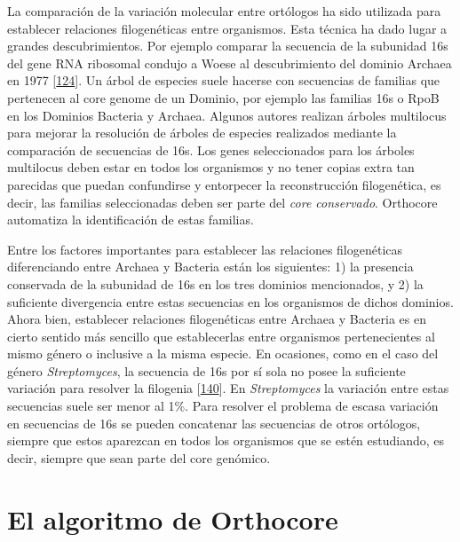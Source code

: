 \documentclass[12pt,twoside]{reedthesis}
\begin{document}
  La comparación de la variación molecular entre ortólogos ha sido
  utilizada para establecer relaciones filogenéticas entre organismos.
  Esta técnica ha dado lugar a grandes descubrimientos. Por ejemplo
  comparar la secuencia de la subunidad 16s del gene RNA ribosomal condujo
  a Woese al descubrimiento del dominio Archaea en 1977
  {[}\protect\hyperlink{ref-woese_phylogenetic_1977}{124}{]}. Un árbol de
  especies suele hacerse con secuencias de familias que pertenecen al core
  genome de un Dominio, por ejemplo las familias 16s o RpoB en los
  Dominios Bacteria y Archaea. Algunos autores realizan árboles multilocus
  para mejorar la resolución de árboles de especies realizados mediante la
  comparación de secuencias de 16s. Los genes seleccionados para los
  árboles multilocus deben estar en todos los organismos y no tener copias
  extra tan parecidas que puedan confundirse y entorpecer la
  reconstrucción filogenética, es decir, las familias seleccionadas deben
  ser parte del \emph{core conservado}. Orthocore automatiza la
  identificación de estas familias.
  
  Entre los factores importantes para establecer las relaciones
  filogenéticas diferenciando entre Archaea y Bacteria están los
  siguientes: 1) la presencia conservada de la subunidad de 16s en los
  tres dominios mencionados, y 2) la suficiente divergencia entre estas
  secuencias en los organismos de dichos dominios. Ahora bien, establecer
  relaciones filogenéticas entre Archaea y Bacteria es en cierto sentido
  más sencillo que establecerlas entre organismos pertenecientes al mismo
  género o inclusive a la misma especie. En ocasiones, como en el caso del
  género \emph{Streptomyces}, la secuencia de 16s por sí sola no posee la
  suficiente variación para resolver la filogenia
  {[}\protect\hyperlink{ref-labeda_phylogenetic_2017}{140}{]}. En
  \emph{Streptomyces} la variación entre estas secuencias suele ser menor
  al 1\%. Para resolver el problema de escasa variación en secuencias de
  16s se pueden concatenar las secuencias de otros ortólogos, siempre que
  estos aparezcan en todos los organismos que se estén estudiando, es
  decir, siempre que sean parte del core genómico.
  
  \section{El algoritmo de Orthocore}\label{el-algoritmo-de-orthocore}
  
\end{document}
